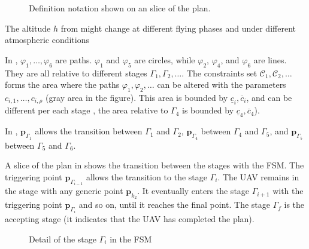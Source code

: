\begin{figure}[t]
    \centering
    
    \caption[Definition notation on a slice of the plan]{Definition notation shown on an slice of the plan.}
    \label{fig:traj1}
\end{figure}

The altitude $h$ from  might change at different flying phases and under different atmospheric conditions

In , $\varphi_1,\dots,\varphi_6$ are paths. $\varphi_1$ and $\varphi_5$ are circles, while $\varphi_2$, $\varphi_4$, and $\varphi_6$ are lines. They are all relative to different stages $\Gamma_1,\Gamma_2,\dots$. The constraints set $\mathcal{C}_1,\mathcal{C}_2,\dots$ forms the area where the paths $\varphi_1,\varphi_2,\dots$ can be altered with the parameters $c_{i,1},\dots,c_{i,\rho}$ (gray area in the figure). This area is bounded by $\underline{c}_i,\overline{c}_i$, and can be different per each stage , the area relative to $\Gamma_4$ is bounded by $\underline{c}_4,\overline{c}_4$).

In , $\mathbf{p}_{\Gamma_1}$ allows the transition between $\Gamma_1$ and $\Gamma_2$, $\mathbf{p}_{\Gamma_4}$ between $\Gamma_4$ and $\Gamma_5$, and $\mathbf{p}_{\Gamma_5}$ between $\Gamma_5$ and $\Gamma_6$.

A slice of the plan in  shows the transition between the stages with the FSM. The triggering point $\mathbf{p}_{\Gamma_{i-1}}$ allows the transition to the stage $\Gamma_i$. The UAV remains in the stage with any generic point $\mathbf{p}_{k_2}$. It eventually enters the stage $\Gamma_{i+1}$ with the triggering point $\mathbf{p}_{\Gamma_i}$ and so on, until it reaches the final point. The stage $\Gamma_f$ is the accepting stage (it indicates that the UAV has completed the plan).

\begin{figure}[h]
  \center
\caption[Detail of a stage in the FSM]{Detail of the stage $\Gamma_i$ in the FSM}
\label{fig:state-machine2}
\end{figure}
    
